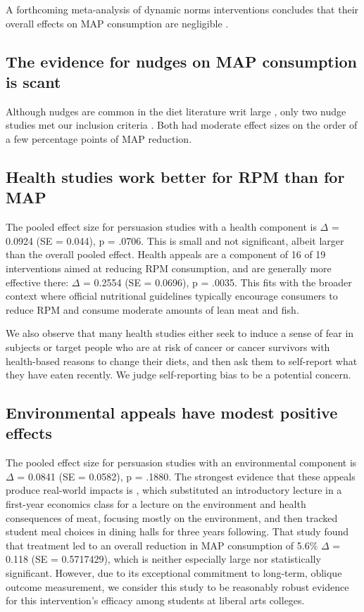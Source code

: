 \documentclass[sn-nature,pdflatex]{sn-jnl}
\begin{document}
A forthcoming meta-analysis of dynamic norms interventions concludes
that their overall effects on MAP consumption are negligible
\citep{Weikertova2024}.

\subsection{The evidence for nudges on MAP consumption is
scant}\label{sec2.6}

Although nudges are common in the diet literature writ large
\citep{olafsson2024, cadario2020, szaszi2018}, only two nudge studies
met our inclusion criteria \citep{andersson2021}. Both had moderate
effect sizes on the order of a few percentage points of MAP reduction.

\subsection{Health studies work better for RPM than for
MAP}\label{sec2.7}

The pooled effect size for persuasion studies with a health component is
\(\Delta\) = 0.0924 (SE = 0.044), p = .0706. This is small and not
significant, albeit larger than the overall pooled effect. Health
appeals are a component of 16 of 19 interventions aimed at reducing RPM
consumption, and are generally more effective there: \(\Delta\) = 0.2554
(SE = 0.0696), p = .0035. This fits with the broader context where
official nutritional guidelines typically encourage consumers to reduce
RPM and consume moderate amounts of lean meat and fish.

We also observe that many health studies either seek to induce a sense
of fear in subjects \citep{berndsen2005} or target people who are at
risk of cancer \citep{hatami2018} or cancer survivors
\citep{james2015, lee2018} with health-based reasons to change their
diets, and then ask them to self-report what they have eaten recently.
We judge self-reporting bias to be a potential concern.

\subsection{Environmental appeals have modest positive
effects}\label{sec2.8}

The pooled effect size for persuasion studies with an environmental
component is \(\Delta\) = 0.0841 (SE = 0.0582), p = .1880. The strongest
evidence that these appeals produce real-world impacts is
\citep{jalil2023}, which substituted an introductory lecture in a
first-year economics class for a lecture on the environment and health
consequences of meat, focusing mostly on the environment, and then
tracked student meal choices in dining halls for three years following.
That study found that treatment led to an overall reduction in MAP
consumption of 5.6\% \(\Delta\) = 0.118 (SE = 0.5717429), which is
neither especially large nor statistically significant. However, due to
its exceptional commitment to long-term, oblique outcome measurement, we
consider this study to be reasonably robust evidence for this
intervention's efficacy among students at liberal arts colleges.
\end{document}

